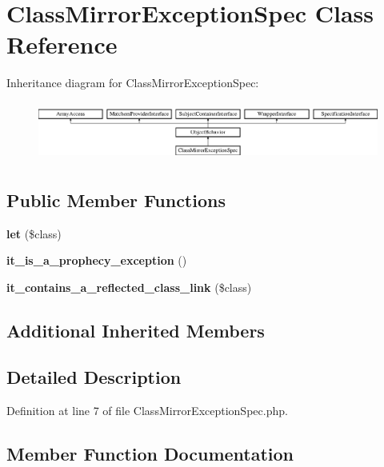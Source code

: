 \section{Class\+Mirror\+Exception\+Spec Class Reference}
\label{classspec_1_1_prophecy_1_1_exception_1_1_doubler_1_1_class_mirror_exception_spec}
Inheritance diagram for Class\+Mirror\+Exception\+Spec\+:\begin{figure}[H]
\begin{center}
\leavevmode
\includegraphics[height=1.953488cm]{classspec_1_1_prophecy_1_1_exception_1_1_doubler_1_1_class_mirror_exception_spec}
\end{center}
\end{figure}
\subsection*{Public Member Functions}
\begin{DoxyCompactItemize}
\item 
{\bf let} (\$class)
\item 
{\bf it\+\_\+is\+\_\+a\+\_\+prophecy\+\_\+exception} ()
\item 
{\bf it\+\_\+contains\+\_\+a\+\_\+reflected\+\_\+class\+\_\+link} (\$class)
\end{DoxyCompactItemize}
\subsection*{Additional Inherited Members}


\subsection{Detailed Description}


Definition at line 7 of file Class\+Mirror\+Exception\+Spec.\+php.



\subsection{Member Function Documentation}
